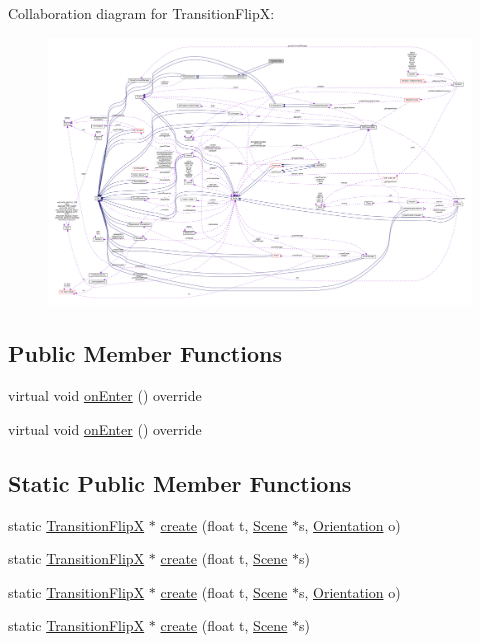 Collaboration diagram for Transition\+FlipX\+:
\nopagebreak
\begin{figure}[H]
\begin{center}
\leavevmode
\includegraphics[width=350pt]{classTransitionFlipX__coll__graph}
\end{center}
\end{figure}
\subsection*{Public Member Functions}
\begin{DoxyCompactItemize}
\item 
virtual void \hyperlink{classTransitionFlipX_a736da7551a598a7f71167870f63a06d4}{on\+Enter} () override
\item 
virtual void \hyperlink{classTransitionFlipX_abe704195ebf90a0adb19bd54446f977b}{on\+Enter} () override
\end{DoxyCompactItemize}
\subsection*{Static Public Member Functions}
\begin{DoxyCompactItemize}
\item 
static \hyperlink{classTransitionFlipX}{Transition\+FlipX} $\ast$ \hyperlink{classTransitionFlipX_a8de7e7710196b3694822d713170d1c50}{create} (float t, \hyperlink{classScene}{Scene} $\ast$s, \hyperlink{classTransitionScene_a0b2b247806fb10a20de0cbc554210c4d}{Orientation} o)
\item 
static \hyperlink{classTransitionFlipX}{Transition\+FlipX} $\ast$ \hyperlink{classTransitionFlipX_ab651e97ca6b287b4a0830bc8c834385c}{create} (float t, \hyperlink{classScene}{Scene} $\ast$s)
\item 
static \hyperlink{classTransitionFlipX}{Transition\+FlipX} $\ast$ \hyperlink{classTransitionFlipX_a264f85e9a405a2a3eafd7a0683645373}{create} (float t, \hyperlink{classScene}{Scene} $\ast$s, \hyperlink{classTransitionScene_a0b2b247806fb10a20de0cbc554210c4d}{Orientation} o)
\item 
static \hyperlink{classTransitionFlipX}{Transition\+FlipX} $\ast$ \hyperlink{classTransitionFlipX_aa8de9aba297a3126453bc2b7c42165ee}{create} (float t, \hyperlink{classScene}{Scene} $\ast$s)
\end{DoxyCompactItemize}
